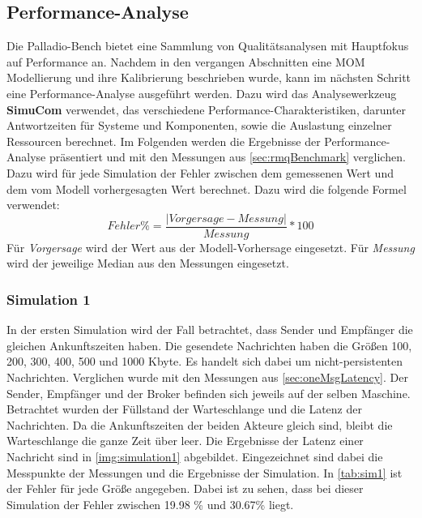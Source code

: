 \subsection{Performance-Analyse}
\label{sec:performanceanalyse}
Die Palladio-Bench bietet eine Sammlung von Qualitätsanalysen mit Hauptfokus auf Performance an. Nachdem in den vergangen Abschnitten eine MOM Modellierung und ihre Kalibrierung beschrieben wurde, kann im nächsten Schritt eine Performance-Analyse ausgeführt werden. Dazu wird das Analysewerkzeug \textbf{SimuCom} verwendet, das verschiedene Performance-Charakteristiken, darunter Antwortzeiten für Systeme und Komponenten, sowie die Auslastung einzelner Ressourcen berechnet. Im Folgenden werden die Ergebnisse der Performance-Analyse präsentiert und mit den Messungen aus \autoref{sec:rmqBenchmark} verglichen. Dazu wird für jede Simulation der Fehler zwischen dem gemessenen Wert und dem vom Modell vorhergesagten Wert berechnet. Dazu wird die folgende Formel verwendet: \[ Fehler\% = \frac{|Vorgersage - Messung|}{Messung} * 100 \] Für \textit{Vorgersage} wird der Wert aus der Modell-Vorhersage eingesetzt. Für \textit{Messung} wird der jeweilige Median aus den Messungen eingesetzt.
\subsubsection{Simulation 1} 
\label{sec:rmqSimulation1}
In der ersten Simulation wird der Fall betrachtet, dass Sender und Empfänger die gleichen Ankunftszeiten haben. Die gesendete Nachrichten haben die Größen 100, 200, 300, 400, 500 und 1000 Kbyte. Es handelt sich dabei um nicht-persistenten Nachrichten. Verglichen wurde mit den Messungen aus \autoref{sec:oneMsgLatency}. Der Sender, Empfänger und der Broker befinden sich jeweils auf der selben Maschine. Betrachtet wurden der Füllstand der Warteschlange und die Latenz der Nachrichten. 
Da die Ankunftszeiten der beiden Akteure gleich sind, bleibt die Warteschlange die ganze Zeit über leer. Die Ergebnisse der Latenz einer Nachricht sind in \autoref{img:simulation1} abgebildet. Eingezeichnet sind dabei die Messpunkte der Messungen und die Ergebnisse der Simulation. In \autoref{tab:sim1} ist der Fehler für jede Größe angegeben. Dabei ist zu sehen, dass bei dieser Simulation der Fehler zwischen 19.98 \% und 30.67\% liegt.

